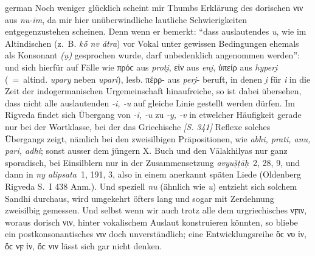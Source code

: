 \begin{otherlanguage*}{german}
Noch weniger glücklich scheint mir Thumbs Erklärung des dorischen νιν aus \emph{nu-im}, da mir hier unüberwindliche lautliche Schwierigkeiten entgegenzustehen scheinen. Denn wenn er bemerkt: “dass auslautendes \emph{u}, wie im Altindischen (z.~B. \emph{kṓ nv átra}) vor Vokal unter gewissen Bedingungen ehemals als Konsonant \emph{(u̯)} gesprochen wurde, darf unbedenklich angenommen werden”: und sich hierfür auf Fälle wie πρόϲ aus \emph{proti̯}, εἰν aus \emph{eni̯}, ὑπείρ aus \emph{hyperi̯} (~=~altind. \emph{upary} neben \emph{upari}), lesb. πέρρ- aus \emph{peri̯}- beruft, in denen \emph{i̯} für \emph{i} in die Zeit der indogermanischen Urgemeinschaft hinaufreiche, so ist dabei übersehen, dass nicht alle auslautenden \emph{-i, -u} auf gleiche Linie gestellt werden dürfen. Im Rigveda findet sich Übergang von \emph{-i, -u} zu \emph{-y, -v} in etwelcher Häufigkeit gerade nur bei der Wortklasse, bei der das Griechische \hypertarget{p341}{\emph{[S. 341]}}\label{p341} Reflexe solches Übergangs zeigt, nämlich bei den zweisilbigen Präpositionen, wie \emph{abhi, prati, anu, pari, adhi}; sonst ausser dem jüngern X. Buch und den Vālakhilyas nur ganz sporadisch, bei Einsilblern nur in der Zusammensetzung \emph{avyuṣ̌ṭāḥ}~2, 28, 9, und dann in \emph{ny alipsata}~1, 191, 3, also in einem anerkannt späten Liede (Oldenberg Rigveda S.~I 438 Anm.). Und speziell \emph{nu} (ähnlich wie \emph{u}) entzieht sich solchem Sandhi durchaus, wird umgekehrt öfters lang und sogar mit Zerdehnung zweisilbig gemessen. Und selbst wenn wir auch trotz alle dem urgriechisches νϝιν, woraus dorisch νιν, hinter vokalischem Auslaut konstruieren könnten, so bliebe ein postkonsonantisches νιν doch unverständlich; eine Entwicklungsreihe ὅϲ νυ ἰν, ὅϲ νϝ ἰν, ὅϲ νιν lässt sich gar nicht denken.


\end{otherlanguage*}

